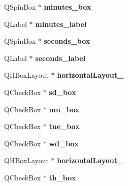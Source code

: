 \begin{DoxyCompactItemize}
\item 
\hypertarget{class_ui___dialog_a03ce64accc7b2dbd50c7b7f6e9ddd2b7}{
QSpinBox $\ast$ {\bfseries minutes\_\-box}}
\label{class_ui___dialog_a03ce64accc7b2dbd50c7b7f6e9ddd2b7}

\item 
\hypertarget{class_ui___dialog_adfd82d3f26f58359dce559a7ac749c47}{
QLabel $\ast$ {\bfseries minutes\_\-label}}
\label{class_ui___dialog_adfd82d3f26f58359dce559a7ac749c47}

\item 
\hypertarget{class_ui___dialog_af248d8c93e202b513f89a5f1d512467f}{
QSpinBox $\ast$ {\bfseries seconds\_\-box}}
\label{class_ui___dialog_af248d8c93e202b513f89a5f1d512467f}

\item 
\hypertarget{class_ui___dialog_aa24e2efaa316c1309ff4dbca49d38aad}{
QLabel $\ast$ {\bfseries seconds\_\-label}}
\label{class_ui___dialog_aa24e2efaa316c1309ff4dbca49d38aad}

\item 
\hypertarget{class_ui___dialog_a501687e996bc322aaeb0ad55909ac7d9}{
QHBoxLayout $\ast$ {\bfseries horizontalLayout\_}}
\label{class_ui___dialog_a501687e996bc322aaeb0ad55909ac7d9}

\item 
\hypertarget{class_ui___dialog_aec0cf1628383935e9b8003e9d65da3f6}{
QCheckBox $\ast$ {\bfseries sd\_\-box}}
\label{class_ui___dialog_aec0cf1628383935e9b8003e9d65da3f6}

\item 
\hypertarget{class_ui___dialog_a8c81129e26e3da217bbb9220588a2e6d}{
QCheckBox $\ast$ {\bfseries mn\_\-box}}
\label{class_ui___dialog_a8c81129e26e3da217bbb9220588a2e6d}

\item 
\hypertarget{class_ui___dialog_ad1d1ee845fd267d3caa799082efdc639}{
QCheckBox $\ast$ {\bfseries tue\_\-box}}
\label{class_ui___dialog_ad1d1ee845fd267d3caa799082efdc639}

\item 
\hypertarget{class_ui___dialog_a9aba2fb39c731818127fba8996826c24}{
QCheckBox $\ast$ {\bfseries wd\_\-box}}
\label{class_ui___dialog_a9aba2fb39c731818127fba8996826c24}

\item 
\hypertarget{class_ui___dialog_a4bb59b2c7c5cc675828f853348cf81b4}{
QHBoxLayout $\ast$ {\bfseries horizontalLayout\_}}
\label{class_ui___dialog_a4bb59b2c7c5cc675828f853348cf81b4}

\item 
\hypertarget{class_ui___dialog_a43f82baf51e4bd06c10bde0174a3be4d}{
QCheckBox $\ast$ {\bfseries th\_\-box}}
\label{class_ui___dialog_a43f82baf51e4bd06c10bde0174a3be4d}


\end{DoxyCompactItemize}
